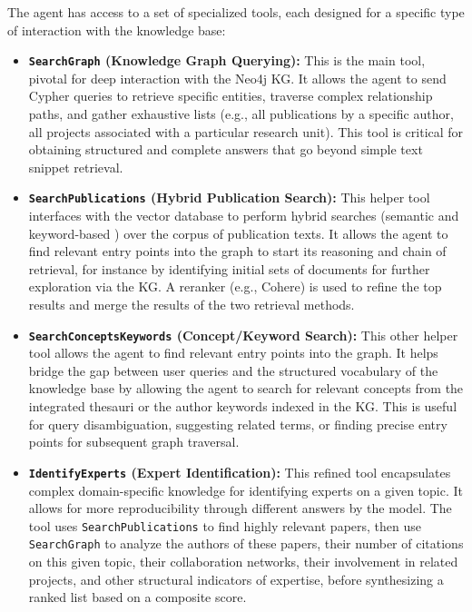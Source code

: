 \documentclass{ecai}
\begin{document}
The agent has access to a set of specialized tools, each designed for a specific type of interaction with the knowledge base:
\begin{itemize}
    \item \textbf{\texttt{SearchGraph} (Knowledge Graph Querying):} This is the main tool, pivotal for deep interaction with the Neo4j KG. It allows the agent to send Cypher queries to retrieve specific entities, traverse complex relationship paths, and gather exhaustive lists (e.g., all publications by a specific author, all projects associated with a particular research unit). This tool is critical for obtaining structured and complete answers that go beyond simple text snippet retrieval.
    \item \textbf{\texttt{SearchPublications} (Hybrid Publication Search):} This helper tool interfaces with the vector database to perform hybrid searches (semantic \citep{karpukhin2020dense, gunther2023jina} and keyword-based \citep{robertson2009probabilisticbm25}) over the corpus of publication texts. It allows the agent to find relevant entry points into the graph to start its reasoning and chain of retrieval, for instance by identifying initial sets of documents for further exploration via the KG. A reranker (e.g., Cohere) is used to refine the top results and merge the results of the two retrieval methods.
    \item \textbf{\texttt{SearchConceptsKeywords} (Concept/Keyword Search):} This other helper tool allows the agent to find relevant entry points into the graph. It helps bridge the gap between user queries and the structured vocabulary of the knowledge base by allowing the agent to search for relevant concepts from the integrated thesauri or the author keywords indexed in the KG. This is useful for query disambiguation, suggesting related terms, or finding precise entry points for subsequent graph traversal.
    \item \textbf{\texttt{IdentifyExperts} (Expert Identification):} This refined tool encapsulates complex domain-specific knowledge for identifying experts on a given topic. It allows for more reproducibility through different answers by the model. The tool uses \texttt{SearchPublications} to find highly relevant papers, then use \texttt{SearchGraph} to analyze the authors of these papers, their number of citations on this given topic, their collaboration networks, their involvement in related projects, and other structural indicators of expertise, before synthesizing a ranked list based on a composite score.
\end{itemize}
\end{document}
